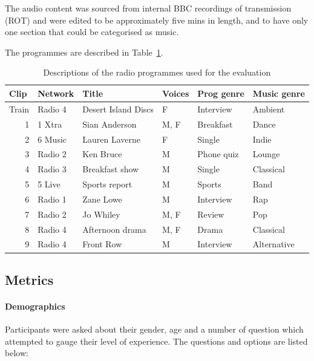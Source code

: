 The audio content was sourced from internal BBC recordings of transmission
(ROT) and were edited to be approximately five mins in length, and to have only
one section that could be categorised as music.

The programmes are described in Table~\ref{tab:clips}.

\begin{table}[htbp]
  \begin{center}
    {\small
    \begin{tabular}{|r|l|l|l|l|l|}
      \hline
      \multicolumn{1}{|l|}{\textbf{Clip}} & \textbf{Network} & \textbf{Title} &
      \textbf{Voices} & \textbf{Prog genre} & \textbf{Music genre} \\ \hline
      Train & Radio 4 & Desert Island Discs & F & Interview & Ambient \\ \hline
      1 & 1 Xtra & Sian Anderson & M, F & Breakfast & Dance \\ \hline
      2 & 6 Music & Lauren Laverne & F & Single & Indie \\ \hline
      3 & Radio 2 & Ken Bruce & M & Phone quiz & Lounge \\ \hline
      4 & Radio 3 & Breakfast show & M & Single & Classical \\ \hline
      5 & 5 Live & Sports report & M & Sports & Band \\ \hline
      6 & Radio 1 & Zane Lowe & M & Interview & Rap \\ \hline
      7 & Radio 2 & Jo Whiley & M, F & Review & Pop \\ \hline
      8 & Radio 4 & Afternoon drama & M, F & Drama & Classical \\ \hline
      9 & Radio 4 & Front Row & M & Interview & Alternative \\ \hline
    \end{tabular}
    }
  \end{center}
  \caption{Descriptions of the radio programmes used for the evaluation}
  \label{tab:clips}
\end{table}

\subsection{Metrics}\label{sec:metrics}
\paragraph{Demographics}
Participants were asked about their gender, age and a number of question which
attempted to gauge their level of experience. The questions and options are
listed below:

